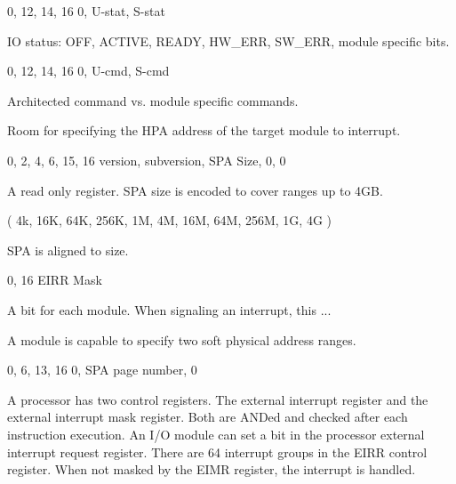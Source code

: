 
\begin{center}
\drawInstrFormatSixtyFour
        {0,  12, 14, 16}
        {0, U-stat, S-stat }
\end{center}

IO status: OFF, ACTIVE, READY, HW\_ERR, SW\_ERR, module specific bits.


\begin{center}
\drawInstrFormatSixtyFour
        {0,  12, 14, 16}
        {0, U-cmd, S-cmd}
\end{center}

Architected command vs. module specific commands.

Room for specifying the HPA address of the target module to interrupt.


\begin{center}
\drawInstrFormatSixtyFour
        {0, 2, 4, 6, 15, 16}
        {version, subversion, SPA Size, 0, 0 }
\end{center}

A read only register. SPA size is encoded to cover ranges up to 4GB. 

( 4k, 16K, 64K, 256K, 1M, 4M, 16M, 64M, 256M, 1G, 4G ) 

SPA is aligned to size.



\begin{center}
\drawInstrFormatSixtyFour
        {0, 16}
        {EIRR Mask }
\end{center}

A bit for each module. When signaling an interrupt, this ...


A module is capable to specify two soft physical address ranges.

\begin{center}
\drawInstrFormatSixtyFour
        {0,  6, 13, 16}
        {0, SPA page number, 0 }
\end{center}


A processor has two control registers. The external interrupt register and the external interrupt mask register. Both are ANDed and checked after each instruction execution. An I/O module can set a bit in the processor external interrupt request register. There are 64 interrupt groups in the EIRR control register. When not masked by the EIMR register, the interrupt is handled.

